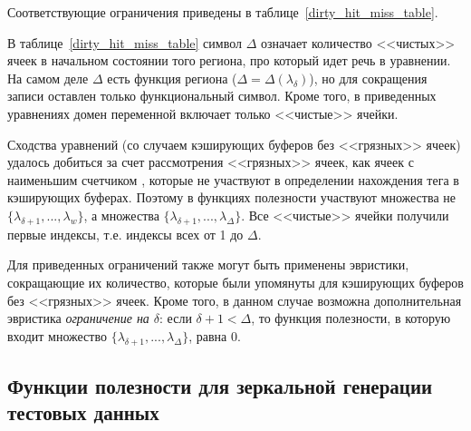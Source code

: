 Соответствующие ограничения приведены в
таблице~\ref{dirty_hit_miss_table}.


В таблице~\ref{dirty_hit_miss_table} символ $\Delta$ означает
количество <<чистых>> ячеек в начальном состоянии того региона, про
который идет речь в уравнении. На самом деле $\Delta$ есть функция
региона ($\Delta = \Delta(\lambda_\delta)$), но для сокращения
записи оставлен только функциональный символ. Кроме того, в
приведенных уравнениях домен переменной включает только <<чистые>>
ячейки.

Сходства уравнений (со случаем кэширующих буферов без <<грязных>>
ячеек) удалось добиться за счет рассмотрения <<грязных>> ячеек, как
ячеек с наименьшим счетчиком \LRU, которые не участвуют в
определении нахождения тега в кэширующих буферах. Поэтому в функциях
полезности участвуют множества не $\{\lambda_{\delta+1}, ...,
\lambda_w\}$, а множества $\{\lambda_{\delta+1}, ...,
\lambda_\Delta\}$. Все <<чистые>> ячейки получили первые индексы,
т.е. индексы всех от 1 до $\Delta$.


Для приведенных ограничений также могут быть применены эвристики,
сокращающие их количество, которые были упомянуты для кэширующих
буферов без <<грязных>> ячеек. Кроме того, в данном случае возможна
дополнительная эвристика \emph{ограничение на $\delta$}: если
$\delta + 1 < \Delta$, то функция полезности, в которую входит
множество $\{\lambda_{\delta+1}, ..., \lambda_\Delta\}$, равна 0.

\subsection{Функции полезности для зеркальной генерации тестовых
данных}

